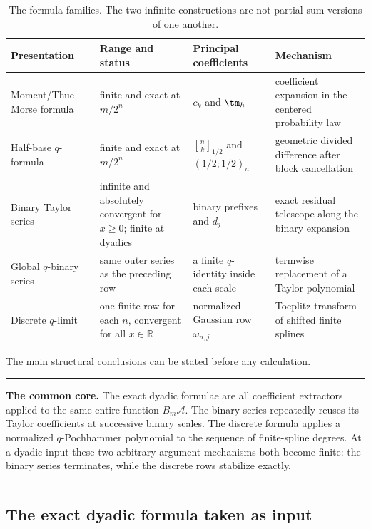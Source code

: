 \documentclass[11pt,oneside]{article}
\theoremstyle{definition}
\theoremstyle{remark}
\newcommand{\R}{\mathbb R}
\newcommand{\qbinom}[3]{\genfrac{[}{]}{0pt}{}{#1}{#2}_{#3}}
\newenvironment{boxedremark}{%
  \par\smallskip\noindent\begin{center}\begin{minipage}{0.94\textwidth}%
  \color{black}\hrule\vspace{0.6em}\small
}{%
  \vspace{0.6em}\hrule\end{minipage}\end{center}\smallskip
}
\begin{document}
\begin{table}[ht]
\centering
\small
\begin{tabularx}{\textwidth}{@{}>{\raggedright\arraybackslash}p{}
>{\raggedright\arraybackslash}p{}
>{\raggedright\arraybackslash}p{}X@{}}
\toprule
Presentation & Range and status & Principal coefficients & Mechanism \\
\midrule
Moment/Thue--Morse formula & finite and exact at $m/2^n$ & $c_k$ and $\tm_h$ & coefficient expansion in the centered probability law \\
Half-base $q$-formula & finite and exact at $m/2^n$ & $\qbinom nk{1/2}$ and $(1/2;1/2)_n$ & geometric divided difference after block cancellation \\
Binary Taylor series & infinite and absolutely convergent for $x\ge0$; finite at dyadics & binary prefixes and $d_j$ & exact residual telescope along the binary expansion \\
Global $q$-binary series & same outer series as the preceding row & a finite $q$-identity inside each scale & termwise replacement of a Taylor polynomial \\
Discrete $q$-limit & one finite row for each $n$, convergent for all $x\in\R$ & normalized Gaussian row $\omega_{n,j}$ & Toeplitz transform of shifted finite splines \\
\bottomrule
\end{tabularx}
\caption{The formula families.  The two infinite constructions are not partial-sum versions
of one another.}
\label{dyadicweb:tab:formula-map}
\end{table}

The main structural conclusions can be stated before any calculation.

\begin{boxedremark}
\textbf{The common core.}
The exact dyadic formulae are all coefficient extractors applied to the same entire function
$B_m\mathscr A$.  The binary series repeatedly reuses its Taylor coefficients at successive
binary scales.  The discrete formula applies a normalized $q$-Pochhammer polynomial to the
sequence of finite-spline degrees.  At a dyadic input these two arbitrary-argument mechanisms
both become finite: the binary series terminates, while the discrete rows stabilize exactly.
\end{boxedremark}

\subsection{The exact dyadic formula taken as input}
\end{document}
